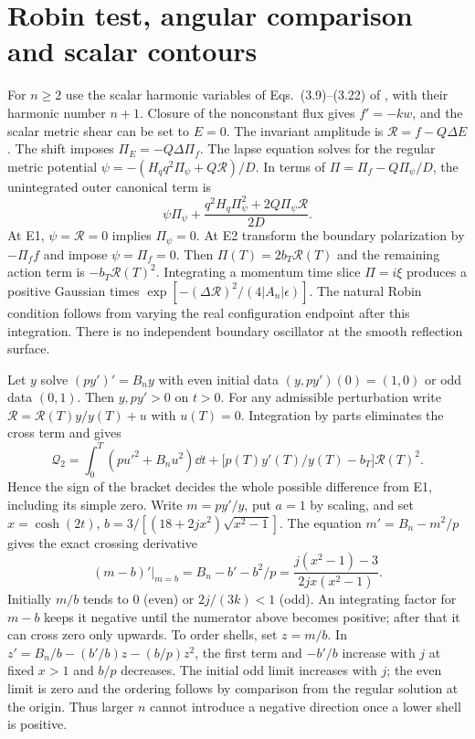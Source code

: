 \section{Robin test, angular comparison and scalar contours}\label{app:robin}
For $n\ge2$ use the scalar harmonic variables of Eqs.~(3.9)--(3.22) of \cite{MM}, with their harmonic number $n+1$. Closure of the nonconstant flux gives $f'=-kw$, and the scalar metric shear can be set to $E=0$. The invariant amplitude is $\mathcal R=f-Q\Delta E$. The shift imposes $\Pi_E=-Q\Delta\Pi_f$. The lapse equation solves for the regular metric potential $\psi=-(H_q q^2\Pi_\psi+Q\mathcal R)/D$. In terms of $\Pi=\Pi_f-Q\Pi_\psi/D$, the unintegrated outer canonical term is
\[
 \psi\Pi_\psi+\frac{q^2 H_q\Pi_\psi^2+2Q\Pi_\psi\mathcal R}{2D}.
\]
At E1, $\psi=\mathcal R=0$ implies $\Pi_\psi=0$. At E2 transform the boundary polarization by $-\Pi_f f$ and impose $\psi=\Pi_f=0$. Then $\Pi(T)=2b_T\mathcal R(T)$ and the remaining action term is $-b_T\mathcal R(T)^2$. Integrating a momentum time slice $\Pi=i\xi$ produces a positive Gaussian times $\exp[-(\Delta\mathcal R)^2/(4|\!A_n\!|\epsilon)]$. The natural Robin condition follows from varying the real configuration endpoint after this integration. There is no independent boundary oscillator at the smooth reflection surface.

Let $y$ solve $(py')'=B_n y$ with even initial data $(y,py')(0)=(1,0)$ or odd data $(0,1)$. Then $y,py'>0$ on $t>0$. For any admissible perturbation write $\mathcal R=\mathcal R(T)y/y(T)+u$ with $u(T)=0$. Integration by parts eliminates the cross term and gives
\[
 \mathcal Q_2=\int_0^T(pu'^2+B_nu^2)\dd t+
       \big[p(T)y'(T)/y(T)-b_T\big]\mathcal R(T)^2 .
\]
Hence the sign of the bracket decides the whole possible difference from E1, including its simple zero. Write $m=py'/y$, put $a=1$ by scaling, and set $x=\cosh(2t)$, $b=3/[(18+2jx^2)\sqrt{x^2-1}]$. The equation $m'=B_n-m^2/p$ gives the exact crossing derivative
\[
 \left.(m-b)'\right|_{m=b}
 =B_n-b'-b^2/p=\frac{j(x^2-1)-3}{2jx(x^2-1)} .
\]
Initially $m/b$ tends to $0$ (even) or $2j/(3k)<1$ (odd). An integrating factor for $m-b$ keeps it negative until the numerator above becomes positive; after that it can cross zero only upwards. To order shells, set $z=m/b$. In $z'=B_n/b-(b'/b)z-(b/p)z^2$, the first term and $-b'/b$ increase with $j$ at fixed $x>1$ and $b/p$ decreases. The initial odd limit increases with $j$; the even limit is zero and the ordering follows by comparison from the regular solution at the origin. Thus larger $n$ cannot introduce a negative direction once a lower shell is positive.

